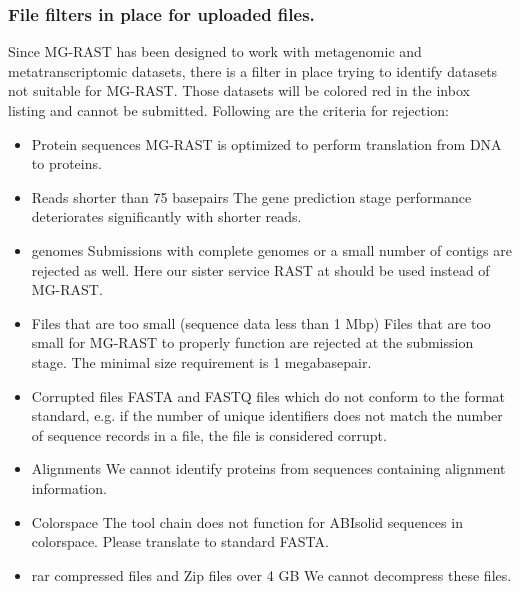 \documentclass[letterpaper,10pt,english]{sphinxmanual}
\begin{document}
\subsubsection{File filters in place for uploaded files.}
\label{\detokenize{faq:file-filters-in-place-for-uploaded-files}}
Since MG-RAST has been designed to work with metagenomic and
metatranscriptomic datasets, there is a filter in place trying to
identify datasets not suitable for MG-RAST. Those datasets will be
colored red in the inbox listing and cannot be submitted. Following are
the criteria for rejection:
\begin{itemize}
\item {} 
Protein sequences \textendash{} MG-RAST is optimized to perform translation from
DNA to proteins.

\item {} 
Reads shorter than 75 basepairs \textendash{} The gene prediction stage
performance deteriorates significantly with shorter reads.

\item {} 
genomes \textendash{} Submissions with complete genomes or a small number of
contigs are rejected as well. Here our sister service RAST at
 should be used instead of MG-RAST.

\item {} 
Files that are too small (sequence data less than 1 Mbp) \textendash{} Files that
are too small for MG-RAST to properly function are rejected at the
submission stage. The minimal size requirement is 1 megabasepair.

\item {} 
Corrupted files \textendash{} FASTA and FASTQ files which do not conform to the
format standard, e.g. if the number of unique identifiers does not
match the number of sequence records in a file, the file is
considered corrupt.

\item {} 
Alignments \textendash{} We cannot identify proteins from sequences containing
alignment information.

\item {} 
Colorspace \textendash{} The tool chain does not function for ABIsolid sequences
in colorspace. Please translate to standard FASTA.

\item {} 
rar compressed files and Zip files over 4 GB \textendash{} We cannot decompress
these files.

\end{itemize}
\end{document}
